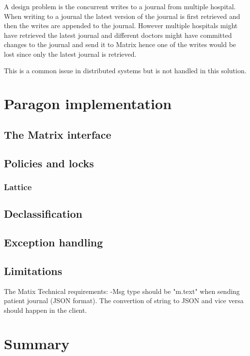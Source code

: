 A design problem is the concurrent writes to a journal from multiple hospital. When writing to a journal the latest version of the journal is first retrieved and then the writes are appended to the journal. However multiple hospitals might have retrieved the latest journal and different doctors might have committed changes to the journal and send it to Matrix hence one of the writes would be lost since only the latest journal is retrieved.

This is a common issue in distributed systems but is not handled in this solution.




\section{Paragon implementation}

\subsection{The Matrix interface}

\subsection{Policies and locks}

\subsubsection{Lattice}

\subsection{Declassification}

\subsection{Exception handling}


\subsection{Limitations}

The Matix 
Technical requirements:
-Msg type should be "m.text" when sending patient journal (JSON format). The convertion of string to JSON and vice versa should happen in the client.

\section{Summary}